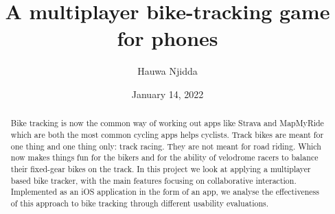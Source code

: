 \documentclass{l4proj}
\begin{document}
\title{A multiplayer bike-tracking game for phones}
\author{Hauwa Njidda}
\date{January 14, 2022}

\maketitle

\begin{abstract}
    Bike tracking is now the common way of working out apps like Strava and MapMyRide which are both the most common cycling apps helps cyclists. Track bikes are meant for one thing and one thing only: track racing. They are not meant for road riding. Which now makes things fun for the bikers and for the ability of velodrome racers to balance their fixed-gear bikes on the track. In this project we look at applying a multiplayer based bike tracker, with the main features focusing on collaborative interaction. Implemented as an iOS application in the form of an app, we analyse the effectiveness of this approach to bike tracking through different usability evaluations. 
\end{abstract}


%
%
%
\educationalconsent


\tableofcontents
\end{document}
